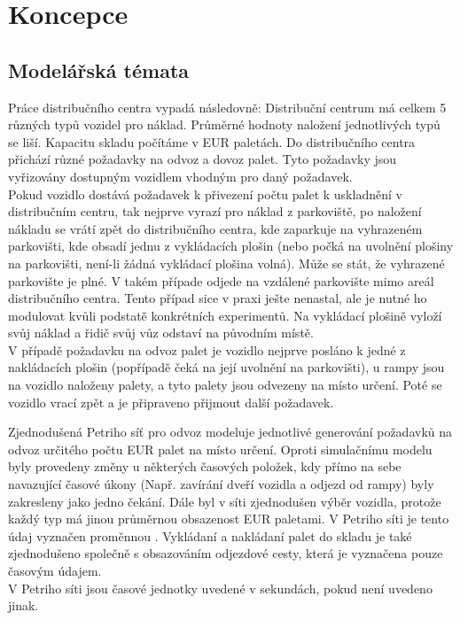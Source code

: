 \documentclass[a4paper, 11pt]{article}
\begin{document}
\section{Koncepce}
\subsection{Modelářská témata}
Práce distribučního centra vypadá následovně:
Distribuční centrum má celkem 5 různých typů vozidel pro náklad. Průměrné hodnoty naložení jednotlivých typů se liší. Kapacitu skladu počítáme v EUR paletách\cite{PAL}. Do distribučního centra přichází různé požadavky na odvoz a dovoz palet. Tyto požadavky jsou vyřizovány dostupným vozidlem vhodným pro daný požadavek.\\
\indent Pokud vozidlo dostává požadavek k přivezení počtu palet k uskladnění v distribučním centru, tak nejprve vyrazí pro náklad z parkoviště, po naložení nákladu se vrátí zpět do distribučního centra, kde zaparkuje na vyhrazeném parkovišti, kde obsadí jednu z vykládacích plošin (nebo počká na uvolnění plošiny na parkovišti, není-li žádná vykládací plošina volná). Může se stát, že vyhrazené parkovište je plné. V takém případe odjede na vzdálené parkovište mimo areál distribučního centra. Tento případ sice v praxi ješte nenastal, ale je nutné ho modulovat kvůli podstatě konkrétních experimentů. Na vykládací plošině vyloží svůj náklad a řidič svůj vůz odstaví na původním místě.\\\indent V případě požadavku na odvoz palet je vozidlo nejprve posláno k jedné z nakládacích plošin (popřípadě čeká na její uvolnění na parkovišti), u rampy jsou na vozidlo naloženy palety, a tyto palety jsou odvezeny na místo určení. Poté se vozidlo vrací zpět a je připraveno přijmout další požadavek.

Zjednodušená Petriho síť pro odvoz modeluje jednotlivé generování požadavků na odvoz určitého počtu EUR palet na místo určení. Oproti simulačnímu modelu byly provedeny změny u některých časových položek, kdy přímo na sebe navazující časové úkony (Např. zavírání dveří vozidla a odjezd od rampy) byly zakresleny jako jedno čekání. Dále byl v síti zjednodušen výběr vozidla, protože každý typ má jinou průměrnou obsazenost EUR paletami. V Petriho síti je tento údaj vyznačen proměnnou . Vykládaní a nakládaní palet do skladu je také zjednodušeno společně s obsazováním odjezdové cesty, která je vyznačena pouze časovým údajem.\\

\noindent V Petriho síti jsou časové jednotky uvedené v sekundách, pokud není uvedeno jinak.
\end{document}
